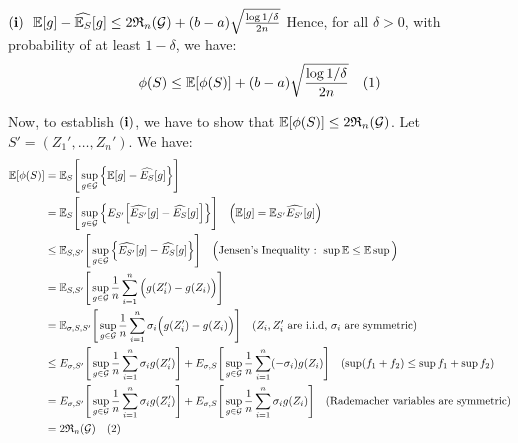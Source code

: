 \begin{proof*}
\begin{subproof}{\newline ${\bf (i)} \ \ \mathbb{E}[g] - \widehat{\mathbb{E}_S}[g] \le 2\mathfrak{R}_n(\mathcal{G}) + (b-a)\sqrt{\frac{\log1/\delta}{2n}}$}
        \noindent Hence, for all $\delta>0$, with probability of at least $1-\delta$, we have:
        \begin{align*}
            \phi(S) \le \mathbb{E}[\phi(S)] + (b-a)\sqrt{
                \frac{\log 1/\delta}{2n}
            } \ \ \ (1)
        \end{align*}
    \end{subproof}

    \noindent Now, to establish ${\bf (i)}$, we have to show that $\mathbb{E}[\phi(S)] \le 2\mathfrak{R}_n(\mathcal{G})$. Let $S'=(Z_1', \dots, Z_n')$. We have:
    \begin{align*}
        \mathbb{E}[\phi(S)] 
            &= \mathbb{E}_S\Bigg[  \sup_{g\in\mathcal{G}} \Big\{  \mathbb{E}[g] - \widehat{E_S}[g]  \Big\}  \Bigg] \\
            &= \mathbb{E}_S\Bigg[ 
                \sup_{g\in\mathcal{G}} \Big\{ 
                    E_{S'} \Big[  \widehat{E_{S'}}[g] - \widehat{E_S}[g] \Big]
                 \Big\}
             \Bigg] \ \ \ \Big(\mathbb{E}[g] = \mathbb{E}_{S'}\widehat{E_{S'}}[g]\Big) \\
            &\le \mathbb{E}_{S, S'} \Bigg[ 
                \sup_{g\in\mathcal{G}} \Big\{ 
                    \widehat{E_{S'}}[g] - \widehat{E_S}[g]
                 \Big\}
             \Bigg] \ \ \ \Big( \text{Jensen's Inequality : } \sup \mathbb{E} \le \mathbb{E}\sup \Big) \\
            &= \mathbb{E}_{S, S'} \Bigg[ 
                \sup_{g\in\mathcal{G}} \frac{1}{n}\sum_{i=1}^n \Big( 
                    g(Z_i') - g(Z_i)
                 \Big)
             \Bigg] \\
            &= \mathbb{E}_{\sigma, S, S'} \Bigg[ 
                \sup_{g\in\mathcal{G}} \frac{1}{n}\sum_{i=1}^n \sigma_i\Big( 
                    g(Z_i') - g(Z_i)
                 \Big)
             \Bigg] \ \ \ (Z_i, Z_i' \text{ are i.i.d, }\sigma_i \text{ are symmetric}) \\
            &\le E_{\sigma, S'} \Bigg[ 
                \sup_{g\in\mathcal{G}} \frac{1}{n}\sum_{i=1}^n \sigma_ig(Z_i')
             \Bigg] + E_{\sigma, S} \Bigg[ 
                \sup_{g\in\mathcal{G}} \frac{1}{n}\sum_{i=1}^n (-\sigma_i)g(Z_i)
             \Bigg] \ \ \ (\sup(f_1 + f_2) \le \sup f_1 + \sup f_2) \\
            &=  E_{\sigma, S'} \Bigg[ 
                \sup_{g\in\mathcal{G}} \frac{1}{n}\sum_{i=1}^n \sigma_ig(Z_i')
             \Bigg] + E_{\sigma, S} \Bigg[ 
                \sup_{g\in\mathcal{G}} \frac{1}{n}\sum_{i=1}^n \sigma_ig(Z_i)
             \Bigg] \ \ \ (\text{Rademacher variables are symmetric})  \\
            &= 2\mathfrak{R}_n(\mathcal{G}) \ \ \ (2)
    \end{align*}


\end{proof*}
